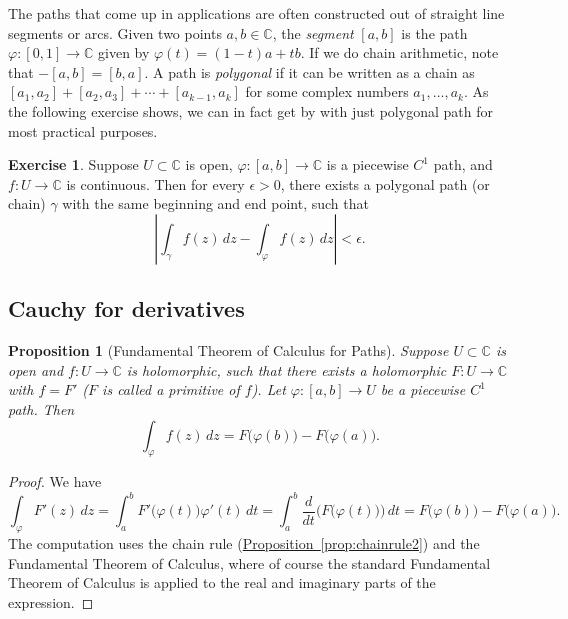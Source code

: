 \documentclass[12pt,openany]{book}
\newcommand{\abs}[1]{\left\lvert {#1} \right\rvert}
\newcommand{\C}{{\mathbb{C}}}
\newcommand{\myindex}[1]{#1\index{#1}}
\theoremstyle{plain}
\newtheorem{prop}[thm]{Proposition}
\theoremstyle{remark}
\theoremstyle{definition}
\newenvironment{exbox}{%
    \def\FrameCommand{\vrule width 1pt \relax\hspace {10pt}}%
    \MakeFramed {\advance \hsize -\width \FrameRestore }%
}{%
    \endMakeFramed
}
\theoremstyle{exercise}
\newtheorem{exercise}{Exercise}[section]
\theoremstyle{example}
\newcommand{\propref}[1]{\hyperref[#1]{Proposition~\ref*{#1}}}
\begin{document}
The paths that come up in applications are often constructed out of straight
line segments or arcs.
Given two points $a,b \in \C$, the \emph{\myindex{segment}} $[a,b]$ is the path
$\varphi \colon [0,1] \to \C$ given by $\varphi(t) = (1-t)a + tb$.
If we do chain arithmetic, note that $-[a,b] = [b,a]$.
A path is \emph{\myindex{polygonal}} if it can be written as a chain
as $[a_1,a_2] + [a_2,a_3] + \cdots + [a_{k-1},a_k]$ for some complex numbers
$a_1,\ldots,a_k$.  As the following exercise shows, we can in fact get by
with just polygonal path for most practical purposes.

\begin{exbox}
\begin{exercise}
Suppose $U \subset \C$ is open, $\varphi \colon [a,b] \to \C$ is a piecewise
$C^1$ path, and $f \colon U \to \C$ is continuous.  Then for every $\epsilon
> 0$, there exists a polygonal path (or chain) $\gamma$ with the same
beginning and end point, such that
\begin{equation*}
\abs{\int_\gamma f(z)\, dz - \int_{\varphi} f(z) \, dz} < \epsilon .
\end{equation*}
\end{exercise}
\end{exbox}

\subsection{Cauchy for derivatives}

\begin{prop}[Fundamental Theorem of Calculus for Paths]
Suppose $U \subset \C$ is open and $f \colon U \to \C$
is holomorphic, such that there exists
a holomorphic $F \colon U \to \C$ with $f = F'$ ($F$ is called
a \emph{\myindex{primitive}} of $f$).
Let $\varphi \colon [a,b] \to U$ be a piecewise $C^1$ path.
Then
\begin{equation*}
\int_\varphi f(z) \, dz =
F\bigl( \varphi(b) \bigr) - F\bigl( \varphi(a)
\bigr) .
\end{equation*}
\end{prop}

\begin{proof}
We have
\begin{equation*}
\int_\varphi F'(z) \, dz
=
\int_a^b F'\bigl(\varphi(t)\bigr) \varphi'(t) \, dt 
=
\int_a^b \frac{d}{dt} \bigl( F\bigl(\varphi(t)\bigr) \bigr) \, dt 
=
F\bigl( \varphi(b) \bigr) - F\bigl( \varphi(a) \bigr) .
\end{equation*}
The computation uses the chain rule (\propref{prop:chainrule2})
and the Fundamental Theorem of Calculus, where of course the
standard Fundamental Theorem of Calculus is applied to the real and imaginary parts
of the expression.
\end{proof}
\end{document}
